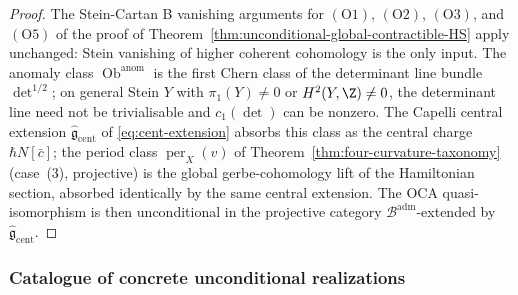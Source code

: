\begin{proof}
The Stein-Cartan B vanishing arguments for
\((\mathrm{O1})\), \((\mathrm{O2})\), \((\mathrm{O3})\), and
\((\mathrm{O5})\) of the proof of
Theorem~\ref{thm:unconditional-global-contractible-HS} apply
unchanged: Stein vanishing of higher coherent cohomology is the
only input.  The anomaly class \(\operatorname{Ob}^{\mathrm{anom}}\)
is the first Chern class of the determinant line bundle
\(\det^{1/2}\); on general Stein \(Y\) with \(\pi_1(Y)\neq 0\) or
\(H^2(Y,\Z)\neq 0\), the determinant line need not be trivialisable
and \(c_1(\det)\) can be nonzero.  The Capelli central extension
\(\widehat{\mathfrak g}_{\mathrm{cent}}\) of \eqref{eq:cent-extension}
absorbs this class as the central charge \(\hbar N[\bar c]\); the
period class \(\operatorname{per}_X(v)\) of
Theorem~\ref{thm:four-curvature-taxonomy} (case~(3), projective) is
the global gerbe-cohomology lift of the Hamiltonian section, absorbed
identically by the same central extension.  The OCA
quasi-isomorphism is then unconditional in the projective category
\(\mathcal B^{\mathrm{adm}}\)-extended by
\(\widehat{\mathfrak g}_{\mathrm{cent}}\).
\end{proof}

\subsubsection{Catalogue of concrete unconditional realizations}
\label{sssec:concrete-realizations}

